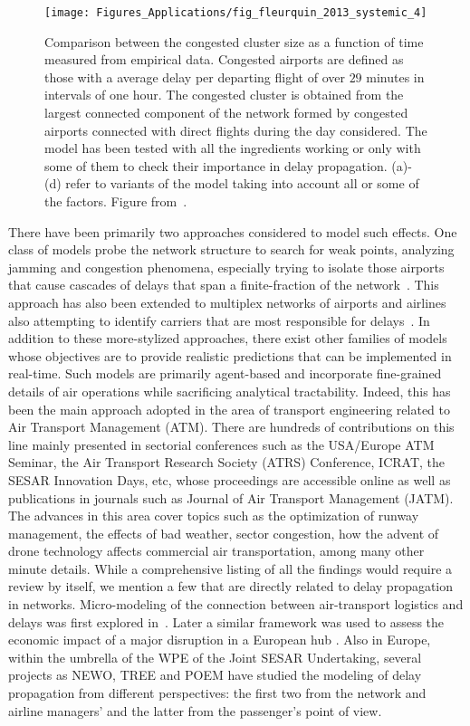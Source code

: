 \begin{figure}[t!]
\centering
\texttt{[image: Figures\_Applications/fig\_fleurquin\_2013\_systemic\_4]}
\caption{Comparison between the congested cluster size as a function of time measured from empirical data. Congested airports are defined as those with a average delay per departing flight of over $29$ minutes in intervals of one hour. The congested cluster is obtained from the largest connected component of the network formed by congested airports connected with direct flights during the day considered. The model has been tested with all the ingredients working or only with some of them to check their importance in delay propagation. (a)-(d) refer to variants of the model taking into account all or some of the factors. Figure from~\cite{fleurquin_2013_systemic}. \label{fig:fleurquin_2013_systemic_4}}
\end{figure}

There have been primarily two approaches considered to model such effects. One class of models probe the network structure to search for weak points, analyzing jamming and congestion phenomena, especially trying to isolate those airports that cause cascades of delays that span a finite-fraction of the network~\cite{lacasa_2009_jamming,wuellner_2010_resilience,ezaki_2014_potential,lordan_2014_study}. This approach has also been extended to multiplex networks of airports and airlines also attempting to identify carriers that are most responsible for delays~\cite{cardillo_2013_modeling}. 
In addition to these more-stylized approaches, there exist other families of models whose objectives are to provide realistic predictions that can be implemented in real-time. Such models are primarily agent-based and incorporate fine-grained details of air operations while sacrificing analytical tractability. Indeed, this has been the main approach adopted in the area of transport engineering related to Air Transport Management (ATM). There are hundreds of contributions on this line mainly presented in sectorial conferences such as the USA/Europe ATM Seminar, the Air Transport Research Society (ATRS) Conference, ICRAT, the SESAR Innovation Days, etc, whose proceedings are accessible online as well as publications in journals such as Journal of Air Transport Management (JATM). The advances in this area cover topics such as the optimization of runway management, the effects of bad weather, sector congestion, how the advent of drone technology affects commercial air transportation, among many other minute details. While a comprehensive listing of all the findings would require a review by itself, we mention a few that are directly related to  delay propagation in networks. Micro-modeling of the connection between air-transport logistics and delays was first explored in~\cite{schaefer_2001_flight,rosenberg_2002_stochastic}. Later a similar framework was used to assess the economic impact of a major disruption in a European hub \cite{janic_2005_modeling}. Also in Europe, within the umbrella of the WPE of the Joint SESAR Undertaking, several projects as NEWO, TREE  and POEM have studied the modeling of delay propagation from different perspectives: the first two from the network and airline managers' and the latter from the passenger's point of view. 

